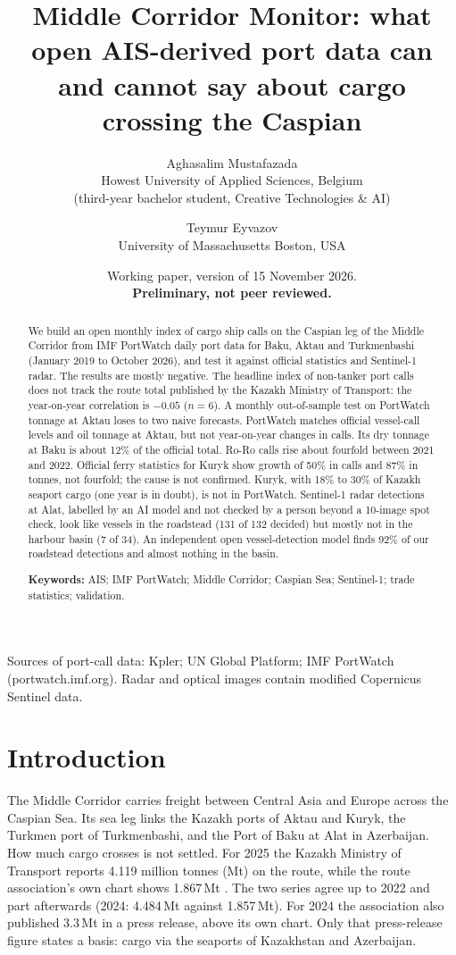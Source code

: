\documentclass[11pt,a4paper]{article}
\title{Middle Corridor Monitor: what open AIS-derived port data can and cannot say about cargo crossing the Caspian}
\author{Aghasalim Mustafazada\\
\small Howest University of Applied Sciences, Belgium\\
\small (third-year bachelor student, Creative Technologies \& AI)
\and
Teymur Eyvazov\\
\small University of Massachusetts Boston, USA}
\date{Working paper, version of 15 November 2026.\\
\textbf{Preliminary, not peer reviewed.}}
\newcommand{\Mt}{\,Mt}
\begin{document}
\maketitle

\begin{abstract}
\noindent We build an open monthly index of cargo ship calls on the Caspian leg of the Middle Corridor from IMF PortWatch daily port data for Baku, Aktau and Turkmenbashi (January 2019 to October 2026), and test it against official statistics and Sentinel-1 radar. The results are mostly negative. The headline index of non-tanker port calls does not track the route total published by the Kazakh Ministry of Transport: the year-on-year correlation is $-0.05$ ($n=6$). A monthly out-of-sample test on PortWatch tonnage at Aktau loses to two naive forecasts. PortWatch matches official vessel-call levels and oil tonnage at Aktau, but not year-on-year changes in calls. Its dry tonnage at Baku is about 12\% of the official total. Ro-Ro calls rise about fourfold between 2021 and 2022. Official ferry statistics for Kuryk show growth of 50\% in calls and 87\% in tonnes, not fourfold; the cause is not confirmed. Kuryk, with 18\% to 30\% of Kazakh seaport cargo (one year is in doubt), is not in PortWatch. Sentinel-1 radar detections at Alat, labelled by an AI model and not checked by a person beyond a 10-image spot check, look like vessels in the roadstead (131 of 132 decided) but mostly not in the harbour basin (7 of 34). An independent open vessel-detection model finds 92\% of our roadstead detections and almost nothing in the basin.

\medskip
\noindent\textbf{Keywords:} AIS; IMF PortWatch; Middle Corridor; Caspian Sea; Sentinel-1; trade statistics; validation.
\end{abstract}

\noindent\small Sources of port-call data: Kpler; UN Global Platform; IMF PortWatch (portwatch.imf.org). Radar and optical images contain modified Copernicus Sentinel data.\normalsize

\section{Introduction}
\label{sec:intro}

The Middle Corridor carries freight between Central Asia and Europe across the Caspian Sea. Its sea leg links the Kazakh ports of Aktau and Kuryk, the Turkmen port of Turkmenbashi, and the Port of Baku at Alat in Azerbaijan. How much cargo crosses is not settled. For 2025 the Kazakh Ministry of Transport reports 4.119 million tonnes (Mt) on the route, while the route association's own chart shows 1.867\Mt{} \cite{titr2026chart}. The two series agree up to 2022 and part afterwards (2024: 4.484\Mt{} against 1.857\Mt). For 2024 the association also published 3.3\Mt{} in a press release, above its own chart. Only that press-release figure states a basis: cargo via the seaports of Kazakhstan and Azerbaijan.
\end{document}
